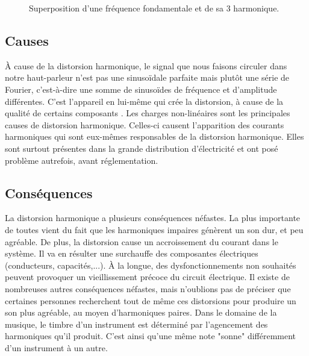 \begin{figure}[ht!]
	\centering
	\caption{Superposition d'une fréquence fondamentale et de sa 3 harmonique.}
	\label{harmonic} 
\end{figure}

\subsection{Causes}
À cause de la distorsion harmonique, le signal que nous faisons circuler dans notre haut-parleur n'est pas
une sinusoïdale parfaite mais plutôt une série de Fourier, c'est-à-dire une somme de sinusoïdes de 
fréquence et d'amplitude différentes. C'est l'appareil en lui-même qui crée la distorsion, à cause de la qualité
de certains composants\cite{cuccia} \cite{termans}.
Les charges non-linéaires sont les principales causes de distorsion harmonique. Celles-ci causent 
l'apparition des courants harmoniques qui sont eux-mêmes responsables de la distorsion harmonique. Elles sont 
surtout présentes dans la grande distribution d'électricité et ont posé problème autrefois, avant réglementation\cite{chargeslin}.

\subsection{Conséquences}
La distorsion harmonique a plusieurs conséquences néfastes.
La plus importante de toutes vient du fait que les harmoniques impaires génèrent un son dur, et peu agréable. De plus, la distorsion cause un accroissement 
du courant dans le système. Il va en résulter une surchauffe des composantes électriques (conducteurs, 
capacités,...). À la longue, des dysfonctionnements non souhaités peuvent provoquer un vieillissement 
précoce du circuit électrique\cite{brevet2}. Il existe de nombreuses autres conséquences néfastes, 
mais n'oublions pas de préciser que certaines personnes recherchent tout de même ces distorsions pour 
produire un son plus agréable, au moyen d'harmoniques paires. Dans le domaine de la musique, le timbre 
d'un instrument est déterminé par l'agencement des harmoniques qu'il produit. C'est ainsi qu'une même note
"sonne" différemment d'un instrument à un autre.

